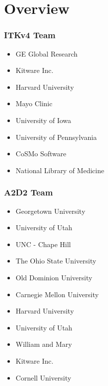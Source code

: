 \section{Overview}







\begin{frame}
\frametitle{ITKv4 Team}
\large
\begin{itemize}
\item GE Global Research
\pause
\item Kitware Inc.
\pause
\item Harvard University
\pause
\item Mayo Clinic
\pause
\item University of Iowa
\pause
\item University of Pennsylvania
\pause
\item CoSMo Software
\pause
\item National Library of Medicine
\end{itemize}
\end{frame}

\begin{frame}
\frametitle{A2D2 Team}
\large
\begin{itemize}
\item Georgetown University
\pause
\item University of Utah
\pause
\item UNC - Chape Hill
\pause
\item The Ohio State University
\pause
\item Old Dominion University
\pause
\item Carnegie Mellon University
\pause
\item Harvard University
\pause
\item University of Utah
\pause
\item William and Mary
\pause
\item Kitware Inc.
\pause
\item Cornell University
\end{itemize}
\end{frame}

